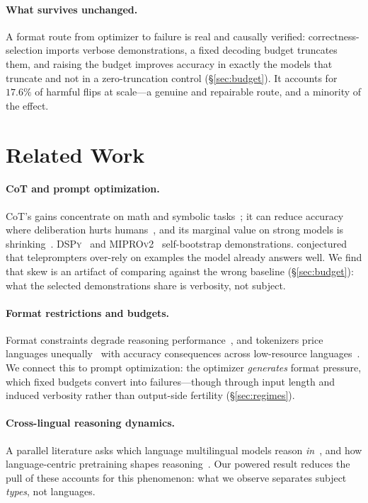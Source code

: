 \documentclass[11pt]{article}
\begin{document}
\paragraph{What survives unchanged.} A format route from optimizer to failure is real
and causally verified: correctness-selection imports verbose demonstrations, a fixed
decoding budget truncates them, and raising the budget improves accuracy in exactly the
models that truncate and not in a zero-truncation control (\S\ref{sec:budget}). It
accounts for $17.6\%$ of harmful flips at scale---a genuine and repairable route, and a
minority of the effect.

\section{Related Work}\label{sec:related}
\paragraph{CoT and prompt optimization.} CoT's gains concentrate on math and symbolic
tasks~\citep{sprague2025cot}; it can reduce accuracy where deliberation hurts
humans~\citep{liu2025mind}, and its marginal value on strong models is
shrinking~\citep{meincke2025decreasing}. \textsc{DSPy}~\citep{khattab2024dspy} and
\textsc{MIPROv2}~\citep{opsahlong2024mipro} self-bootstrap demonstrations.
\citet{sarmah2024} conjectured that teleprompters over-rely on examples the model already
answers well. We find that skew is an artifact of comparing against the wrong baseline
(\S\ref{sec:budget}): what the selected demonstrations share is verbosity, not subject.
\paragraph{Format restrictions and budgets.} Format constraints degrade reasoning
performance~\citep{tam2024format}, and tokenizers price languages
unequally~\citep{petrov2023tokenizer} with accuracy consequences across low-resource
languages~\citep{lundin2025tokentax}. We connect this to prompt optimization: the
optimizer \emph{generates} format pressure, which fixed budgets convert into
failures---though through input length and induced verbosity rather than output-side
fertility (\S\ref{sec:regimes}).
\paragraph{Cross-lingual reasoning dynamics.} A parallel literature asks which language
multilingual models reason \emph{in}~\citep{wendler2024llamas,schut2025english,
zhong2024english}, and how language-centric pretraining shapes
reasoning~\citep{park2025collapse,tran2025pivoted}. Our powered result reduces the pull
of these accounts for this phenomenon: what we observe separates subject \emph{types},
not languages.
\end{document}
